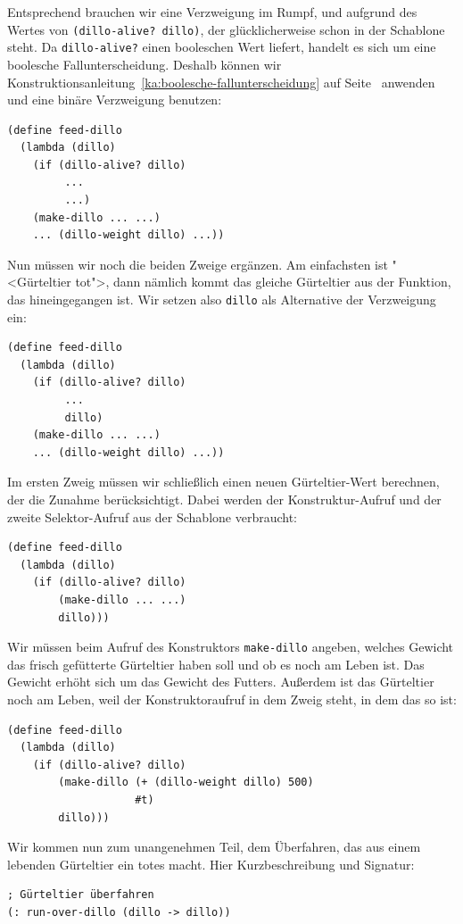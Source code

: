 Entsprechend brauchen wir eine Verzweigung im Rumpf, und aufgrund
des Wertes von \lstinline{(dillo-alive? dillo)}, der glücklicherweise schon in der
Schablone steht.  Da \lstinline{dillo-alive?} einen booleschen Wert
liefert, handelt es sich um eine boolesche Fallunterscheidung.
Deshalb 
können wir Konstruktionsanleitung~\ref{ka:boolesche-fallunterscheidung}
auf Seite~\pageref{ka:boolesche-fallunterscheidung} anwenden und eine
binäre Verzweigung benutzen:
%
\begin{lstlisting}
(define feed-dillo
  (lambda (dillo)
    (if (dillo-alive? dillo)
         ...
         ...)
    (make-dillo ... ...)
    ... (dillo-weight dillo) ...))
\end{lstlisting}
%
Nun müssen wir noch die beiden Zweige ergänzen.  Am
einfachsten ist "<Gürteltier tot">, dann nämlich kommt
das gleiche Gürteltier aus der Funktion, das hineingegangen ist.  Wir
setzen also \lstinline{dillo} als Alternative der Verzweigung ein:
%
\begin{lstlisting}
(define feed-dillo
  (lambda (dillo)
    (if (dillo-alive? dillo)
         ...
         dillo)
    (make-dillo ... ...)
    ... (dillo-weight dillo) ...))
\end{lstlisting}
%
Im ersten Zweig müssen wir schließlich einen neuen Gürteltier-Wert
berechnen, der die Zunahme berücksichtigt.  Dabei werden der
Konstruktur-Aufruf und der zweite Selektor-Aufruf aus der Schablone
verbraucht:
\begin{lstlisting}
(define feed-dillo
  (lambda (dillo)
    (if (dillo-alive? dillo)
        (make-dillo ... ...)
        dillo)))
\end{lstlisting}
%
Wir müssen beim Aufruf des Konstruktors \lstinline{make-dillo} angeben,
welches Gewicht das frisch gefütterte Gürteltier haben soll und ob es
noch am Leben ist.  Das Gewicht erhöht sich um das Gewicht des
Futters.  Außerdem ist das Gürteltier noch am Leben, weil der
Konstruktoraufruf in dem Zweig steht, in dem das so ist:
%
\begin{lstlisting}
(define feed-dillo
  (lambda (dillo)
    (if (dillo-alive? dillo)
        (make-dillo (+ (dillo-weight dillo) 500)
                    #t)
        dillo)))
\end{lstlisting}
%
Wir kommen nun zum unangenehmen Teil, dem Überfahren, das aus einem
lebenden Gürteltier ein totes macht.  Hier Kurzbeschreibung und
Signatur:\label{page:run-over-dillo}
%
\begin{lstlisting}
; Gürteltier überfahren
(: run-over-dillo (dillo -> dillo))
\end{lstlisting}
